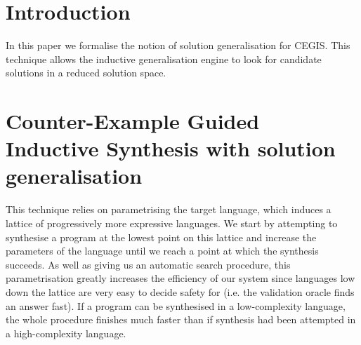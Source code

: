 \documentclass[runningheads,a4paper]{llncs}
\begin{document}
\section{Introduction}

In this paper we formalise the notion of solution generalisation for CEGIS. 
This technique allows the inductive generalisation engine to look for 
candidate solutions in a reduced solution space.

\section{Counter-Example Guided Inductive Synthesis with solution generalisation}

This technique relies on parametrising the target language, which
induces a lattice of progressively more expressive languages.  We
start by attempting to synthesise a program at the lowest point on
this lattice and increase the parameters of the language until we
reach a point at which the synthesis succeeds. As well as giving us an
automatic search procedure, this parametrisation greatly increases the
efficiency of our system since languages low down the lattice are very
easy to decide safety for (i.e. the validation oracle finds an answer
fast). If a program can be synthesised in a low-complexity language,
the whole procedure finishes much faster than if synthesis had been
attempted in a high-complexity language.
\end{document}
